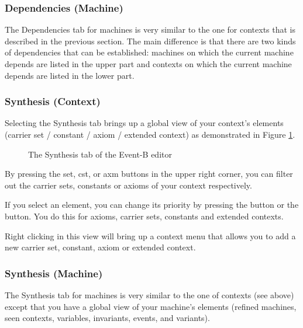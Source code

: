 \subsubsection{Dependencies (Machine)}

The \textsf{Dependencies} tab for machines is very similar to the one for contexts that is described in the previous section. The main difference is that there are two kinds of dependencies that can be established: machines on which the current machine depends are listed in the upper part and contexts on which the current machine depends are listed in the lower part.

\subsubsection{Synthesis (Context)}

Selecting the \textsf{Synthesis} tab brings up a global view of your context's elements (carrier set / constant / axiom / extended context) as demonstrated in Figure \ref{fig_ref_01_eventb_editor11}. 

\begin{figure}[!ht]
\begin{center}
	\caption{The Synthesis tab of the Event-B editor}
	\label{fig_ref_01_eventb_editor11}
\end{center}
\end{figure}

By pressing the \textsf{set}, \textsf{cst}, or \textsf{axm} buttons in the upper right corner, you can filter out the carrier sets, constants or axioms of your context respectively.

If you select an element, you can change its priority by pressing the  button or the  button. You do this for axioms, carrier sets, constants and extended contexts.

Right clicking in this view will bring up a context menu that allows you to add a new carrier set, constant, axiom or extended context. 

\subsubsection{Synthesis (Machine)}

The \textsf{Synthesis} tab for machines is very similar to the one of contexts (see above) except that you have a global view of your machine's elements (refined machines, seen contexts, variables, invariants, events, and variants).

